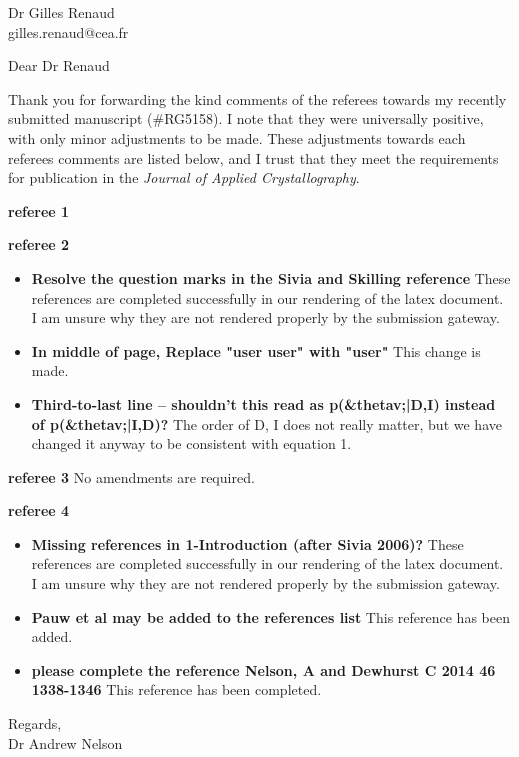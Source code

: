 \documentclass[fontsize=12pt, paper=a4]{scrlttr2}
\begin{document}
\begin{letter}{Dr Gilles Renaud \\ gilles.renaud@cea.fr}

\opening{Dear Dr Renaud}  %
Thank you for forwarding the kind comments of the referees towards my recently submitted manuscript (\#RG5158). I note that they were universally positive, with only minor adjustments to be made. These adjustments towards each referees comments are listed below, and I trust that they meet the requirements for publication in the \emph{Journal of Applied Crystallography}.


\textbf{referee 1}


\textbf{referee 2}
\begin{itemize}
\item \textbf{Resolve the question marks in the Sivia and Skilling reference} These references are completed successfully in our rendering of the latex document. I am unsure why they are not rendered properly by the submission gateway.
\item \textbf{In middle of page, Replace "user user" with "user"} This change is made.
\item \textbf{Third-to-last line – shouldn't this read as p(&thetav;|D,I) instead of p(&thetav;|I,D)?} The order of D, I does not really matter, but we have changed it anyway to be consistent with equation 1.
\end{itemize}


\textbf{referee 3}
No amendments are required.


\textbf{referee 4}
\begin{itemize}
\item \textbf{Missing references in 1-Introduction (after Sivia 2006)?} These references are completed successfully in our rendering of the latex document. I am unsure why they are not rendered properly by the submission gateway.
\item \textbf{Pauw et al may be added to the references list} This reference has been added.
\item \textbf{please complete the reference Nelson, A and Dewhurst C 2014 46 1338-1346} This reference has been completed.
\end{itemize}


\closing{Regards, \\ Dr Andrew Nelson} %

\end{letter}
\end{document}
